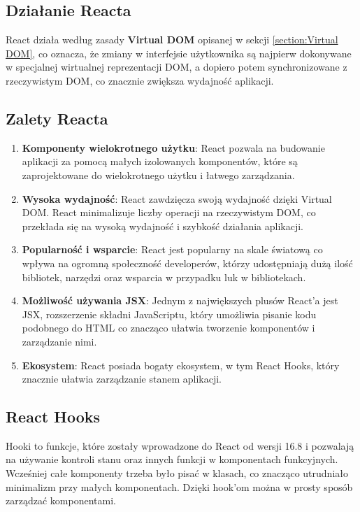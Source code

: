 \subsection{Działanie Reacta}
React działa według zasady \textbf{Virtual DOM} opisanej w sekcji \ref{section:Virtual DOM}, co oznacza, że zmiany w interfejsie użytkownika są najpierw dokonywane w specjalnej wirtualnej reprezentacji DOM, a dopiero potem synchronizowane z rzeczywistym DOM, co znacznie zwiększa wydajność aplikacji.
\subsection{Zalety Reacta}

\begin{enumerate}
    \item \textbf{Komponenty wielokrotnego użytku}: React pozwala na budowanie aplikacji za pomocą małych izolowanych komponentów, które są zaprojektowane do wielokrotnego użytku i łatwego zarządzania.
    \item \textbf{Wysoka wydajność}: React zawdzięcza swoją wydajność dzięki Virtual DOM. React minimalizuje liczby operacji na rzeczywistym DOM, co przekłada się na wysoką wydajność i szybkość działania aplikacji.
    \item \textbf{Popularność i wsparcie}: React jest popularny na skale światową co wpływa na ogromną społeczność developerów, którzy udostępniają dużą ilość bibliotek, narzędzi oraz wsparcia w przypadku luk w bibliotekach.
    \item \textbf{Możliwość używania JSX}: Jednym z największych plusów React'a jest JSX, rozszerzenie składni JavaScriptu, który umożliwia pisanie kodu podobnego do HTML co znacząco ułatwia tworzenie komponentów i zarządzanie nimi.
    \item \textbf{Ekosystem}: React posiada bogaty ekosystem, w tym React Hooks, który znacznie ułatwia zarządzanie stanem aplikacji.
\end{enumerate}

\subsection{React Hooks}
Hooki to funkcje, które zostały wprowadzone do React od wersji 16.8 i pozwalają na używanie kontroli stanu oraz innych funkcji w komponentach funkcyjnych. Wcześniej całe komponenty trzeba było pisać w klasach, co znacząco utrudniało minimalizm przy małych komponentach. Dzięki hook'om można w prosty sposób zarządzać komponentami.

